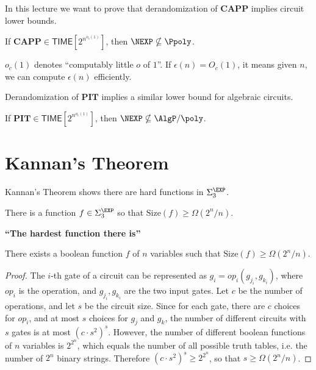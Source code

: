\documentclass[letterpaper, 12pt]{article}
\newcommand{\CAPP}{\mathbf{CAPP}}
\newcommand{\PIT}{\mathbf{PIT}}
\newcommand{\Time}[1]{\mathsf{TIME}[#1]}
\newcommand{\Size}[1]{\mathrm{Size}(#1)}
\begin{document}
In this lecture we want to prove that derandomization of $\CAPP$ implies circuit lower bounds.

\begin{theorem} [IKW]\label{IKW}
	If $\CAPP \in \Time{2^{n^{o_c(1)}}}$, then $\NEXP \nsubseteq \Ppoly$.
\end{theorem}

$o_c(1)$ denotes ``computably little $o$ of $1$''. If $\epsilon(n) = O_c(1)$, it means given $n$, we can compute $\epsilon(n)$ efficiently.

Derandomization of $\PIT$ implies a similar lower bound for algebraic circuits.

\begin{theorem} [KI]
	If $\PIT \in \Time{2^{n^{o_c(1)}}}$, then $\NEXP \nsubseteq \AlgP / \poly$.
\end{theorem}


\section{Kannan's Theorem}

Kannan's Theorem shows there are hard functions in $\Sigma_3^\EXP$.

\begin{theorem}[Kannan]
	There is a function $f \in \Sigma_3^\EXP$ so that $\Size{f} \geq \Omega(2^n / n)$.
\end{theorem}

\noindent \textbf{``The hardest function there is''}

\begin{lemma}
There exists a boolean function $f$ of $n$ variables such that $\Size{f} \geq \Omega(2^n / n)$.
\end{lemma}

\begin{proof}
	The $i$-th gate of a circuit can be represented as
	$g_i = op_i (g_{j_i}, g_{k_i})$, where $op_i$ is the operation, and $g_{j_i}, g_{k_i}$ are the two input gates.
	Let $c$ be the number of operations, and let $s$ be the circuit size.
	Since for each gate, there are $c$ choices for $op_i$, and at most $s$ choices for $g_j$ and $g_k$,
	the number of different circuits with $s$ gates is at most $(c \cdot s^2)^s$.
	However, the number of different boolean functions of $n$ variables is $2^{2^n}$, which equals the number of all possible truth tables, i.e. the number of $2^n$ binary strings.
	Therefore $(c \cdot s^2)^s \geq 2^{2^n}$, so that $s \geq \Omega(2^n / n)$.
\end{proof}
\end{document}
